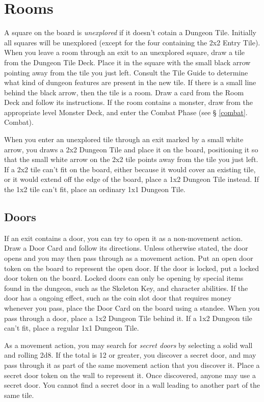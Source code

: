 \documentclass{book}
\begin{document}
\section{Rooms}
A square on the board is \emph{unexplored} if it doesn’t cotain a Dungeon Tile. Initially all squares will be unexplored (except for the four containing the 2x2 Entry Tile). When you leave a room through an exit to an unexplored square, draw a tile from the Dungeon Tile Deck. Place it in the square with the small black arrow pointing away from the tile you just left. Consult the Tile Guide to determine what kind of dungeon features are present in the new tile. If there is a small line behind the black arrow, then the tile is a room. Draw a card from the Room Deck and follow its instructions. If the room contains a monster, draw from the appropriate level Monster Deck, and enter the Combat Phase (see § \ref{combat}. Combat).

When you enter an unexplored tile through an exit marked by a small white arrow, you draws a 2x2 Dungeon Tile and place it on the board, positioning it so that the small white arrow on the 2x2 tile points away from the tile you just left. If a 2x2 tile can’t fit on the board, either because it would cover an existing tile, or it would extend off the edge of the board, place a 1x2 Dungeon Tile instead. If the 1x2 tile can’t fit, place an ordinary 1x1 Dungeon Tile.  

\subsection{Doors} \label{doors}

If an exit contains a door, you can try to open it as a non-movement action. Draw a Door Card and follow its directions. Unless otherwise stated, the door opens and you may then pass through as a movement action. Put an open door token on the board to represent the open door. If the door is locked, put a locked door token on the board. Locked doors can only be opening by special items found in the dungeon, such as the Skeleton Key, and character abilities. If the door has a ongoing effect, such as the coin slot door that requires money whenever you pass, place the Door Card on the board using a standee.
When you pass through a door, place a 1x2 Dungeon Tile behind it. If a 1x2 Dungeon tile can’t fit, place a regular 1x1 Dungeon Tile.

As a movement action, you may search for \emph{secret doors} by selecting a solid wall and rolling 2d8. If the total is 12 or greater, you discover a secret door, and may pass through it as part of the same movement action that you discover it. Place a secret door token on the wall to represent it. Once discovered, anyone may use a secret door.
You cannot find a secret door in a wall leading to another part of the same tile.
\end{document}
